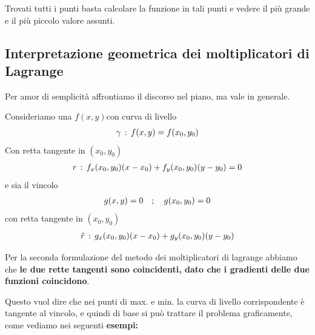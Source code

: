 Trovati tutti i punti basta calcolare la funzione in tali punti e vedere il più grande e il più piccolo valore assunti.

\newpage

\subsection{Interpretazione geometrica dei moltiplicatori di Lagrange}

Per amor di semplicità affrontiamo il discorso nel piano, ma vale in generale.

Consideriamo una $f(x,y)$con curva di livello
\begin{align}
	\gamma \, : \, f(x,y)=f(x_0,y_0)
\end{align}
Con retta tangente in $(x_0,y_0)$
\begin{align}
	r \, : \, f_x(x_0,y_0) (x-x_0) + f_y(x_0,y_0)(y-y_0)=0
\end{align}
e sia il vincolo
\begin{align}
	g(x,y)=0 \quad ; \quad g(x_0,y_0) =0
\end{align}
con retta tangente in $(x_0,y_0)$
\begin{align}
	\tilde{r} \, : \, g_x(x_0,y_0)(x-x_0) + g_y(x_0,y_0)(y-y_0)
\end{align}

Per la seconda formulazione del metodo dei moltiplicatori di lagrange abbiamo che \textbf{le due rette tangenti sono coincidenti, dato che i gradienti delle due funzioni coincidono}.

Questo vuol dire che nei punti di max. e min. la curva di livello corrispondente è tangente al vincolo, e quindi di base si può trattare il problema graficamente, come vediamo nei seguenti \textbf{esempi:}

